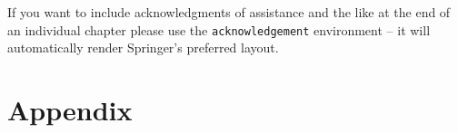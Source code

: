 \documentclass[graybox,envcountchap,sectrefs%
,footinfo
]{svmono}
\begin{document}
\begin{acknowledgement}
If you want to include acknowledgments of assistance and the like at the end of an individual chapter please use the \verb|acknowledgement| environment -- it will automatically render Springer's preferred layout.
\end{acknowledgement}
%
\section*{Appendix}
%

\end{document}
